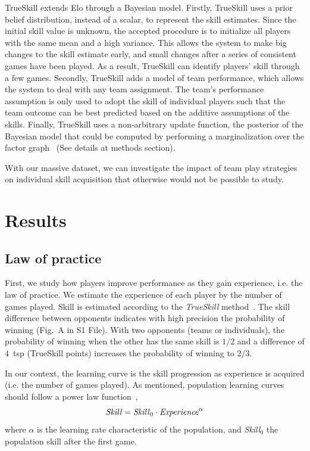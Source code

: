 \documentclass[a4paper,10pt]{book}
\theoremstyle{definition}
\begin{document}
TrueSkill extends Elo through a Bayesian model.
Firstly, TrueSkill uses a prior belief distribution, instead of a scalar, to represent the skill estimates.
Since the initial skill value is unknown, the accepted procedure is to initialize all players with the same mean and a high variance.
This allows the system to make big changes to the skill estimate early, and small changes after a series of consistent games have been played.
As a result, TrueSkill can identify players' skill through a few games.
Secondly, TrueSkill adds a model of team performance, which allows the system to deal with any team assignment.
The team's performance assumption is only used to adopt the skill of individual players such that the team outcome can be best predicted based on the additive assumptions of the skills.
Finally, TrueSkill uses a non-arbitrary update function, the posterior of the Bayesian model that could be computed by performing a marginalization over the factor graph~\cite{kschischang2001-factorGraphsAndTheSumProductAlgorithm} (See details at methods section).

With our massive dataset, we can investigate the impact of team play strategies on individual skill acquisition that otherwise would not be possible to study.

\section{Results}

\subsection{Law of practice}

First, we study how players improve performance as they gain experience, i.e. the law of practice. 
We estimate the experience of each player by the number of games played.
Skill is estimated according to the \emph{TrueSkill} method~\cite{herbrich2006-trueskill}.
The skill difference between opponents indicates with high precision the probability of winning (Fig.~A in S1 File).
With two opponents (teams or individuals), the probability of winning when the other has the same skill is $1/2$ and a difference of $4$~tsp (TrueSkill points) increases the probability of winning to $2/3$. 

In our context, the learning curve is the skill progression as experience is acquired (i.e. the number of games played). 
As mentioned, population learning curves should follow a power law function~\cite{newell1981-skillAcquisitionAndLawOfPractice},
\begin{equation}\label{lawOfPractice}
   \text{\emph{Skill}} = \text{\emph{Skill}}_0 \cdot \text{\emph{Experience}}^{\alpha}
\end{equation} 
where $\alpha$ is the learning rate characteristic of the population, and \emph{Skill}$_0$ the population skill after the first game.
\end{document}
